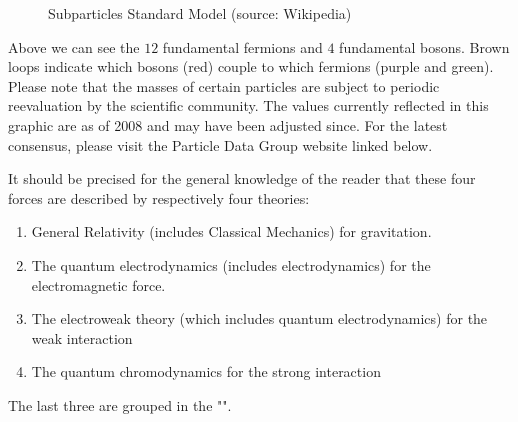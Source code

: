 \begin{figure}[H]
		\caption[Subparticles Standard Model]{Subparticles Standard Model (source: Wikipedia)}
	\end{figure}
	Above we can see the $12$ fundamental fermions and $4$ fundamental bosons. Brown loops indicate which bosons (red) couple to which fermions (purple and green). Please note that the masses of certain particles are subject to periodic reevaluation by the scientific community. The values currently reflected in this graphic are as of 2008 and may have been adjusted since. For the latest consensus, please visit the Particle Data Group website linked below.
	
	It should be precised for the general knowledge of the reader that these four forces are described by respectively four theories:
	\begin{enumerate}
		\item General Relativity (includes Classical Mechanics) for gravitation.

		\item The quantum electrodynamics (includes electrodynamics) for the electromagnetic force.

		\item The electroweak theory (which includes quantum electrodynamics) for the weak interaction

		\item The quantum chromodynamics for the strong interaction
	\end{enumerate}
	The last three are grouped in the "".
	
